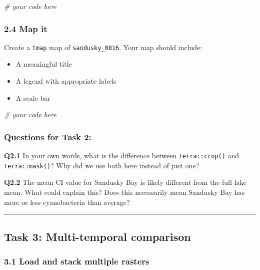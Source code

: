 \documentclass[
]{article}
\newenvironment{Shaded}{\begin{snugshade}}{\end{snugshade}}
\newcommand{\CommentTok}[1]{\textcolor[rgb]{0.56,0.35,0.01}{\textit{#1}}}
\providecommand{\tightlist}{%
  \setlength{\itemsep}{0pt}\setlength{\parskip}{0pt}}
\begin{document}
\begin{Shaded}
\begin{Highlighting}[]
\CommentTok{\# your code here}
\end{Highlighting}
\end{Shaded}

\subsubsection{2.4 Map it}\label{map-it}

Create a \texttt{tmap} map of \texttt{sandusky\_0816}. Your map should
include:

\begin{itemize}
\tightlist
\item
  A meaningful title
\item
  A legend with appropriate labels
\item
  A scale bar
\end{itemize}

\begin{Shaded}
\begin{Highlighting}[]
\CommentTok{\# your code here}
\end{Highlighting}
\end{Shaded}

\subsubsection{Questions for Task 2:}\label{questions-for-task-2}

\textbf{Q2.1} In your own words, what is the difference between
\texttt{terra::crop()} and \texttt{terra::mask()}? Why did we use both
here instead of just one?

\textbf{Q2.2} The mean CI value for Sandusky Bay is likely different
from the full lake mean. What could explain this? Does this necessarily
mean Sandusky Bay has more or less cyanobacteria than average?

\begin{center}\rule{0.5\linewidth}{0.5pt}\end{center}

\subsection{Task 3: Multi-temporal
comparison}\label{task-3-multi-temporal-comparison}

\subsubsection{3.1 Load and stack multiple
rasters}\label{load-and-stack-multiple-rasters}
\end{document}
